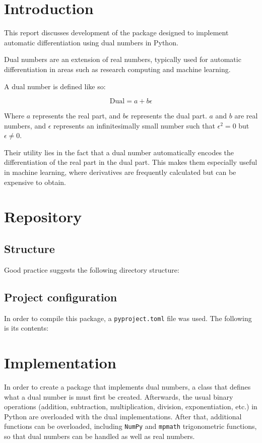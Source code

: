 \documentclass[11pt,a4paper]{article}
\begin{document}
 

\section{Introduction}
This report discusses development of the package designed to implement automatic differentiation using dual numbers in Python. 

Dual numbers are an extension of real numbers, typically used for automatic differentiation in areas such as research computing and machine learning.

A dual number is defined like so:

\begin{equation}
    \mathrm{Dual} = a + b \epsilon
\end{equation}

Where $a$ represents the real part, and $b\epsilon$ represents the dual part. $a$ and $b$ are real numbers, and $\epsilon$ represents an infinitesimally small number such that $\epsilon^2 = 0$ but $\epsilon \neq 0$.

Their utility lies in the fact that a dual number automatically encodes the differentiation of the real part in the dual part. This makes them especially useful in machine learning, where derivatives are frequently calculated but can be expensive to obtain.

\section{Repository}
\subsection{Structure}
Good practice suggests the following directory structure:


\subsection{Project configuration}
In order to compile this package, a \texttt{pyproject.toml} file was used. The following is its contents:


\section{Implementation}
In order to create a package that implements dual numbers, a class that defines what a dual number is must first be created. Afterwards, the usual binary operations (addition, subtraction, multiplication, division, exponentiation, etc.) in Python are overloaded with the dual implementations. After that, additional functions can be overloaded, including \texttt{NumPy} and \texttt{mpmath} trigonometric functions, so that dual numbers can be handled as well as real numbers. 
\end{document}
